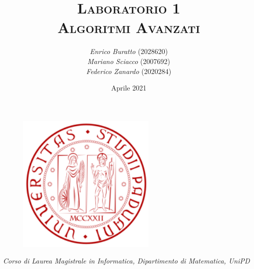 \documentclass[12pt]{article}
\title{ \huge\textsc{Laboratorio 1} \\
		\large\textsc{Algoritmi Avanzati}}
\author{\textit{Enrico Buratto} (2028620)\\ 
        \textit{Mariano Sciacco} (2007692)\\
        \textit{Federico Zanardo} (2020284)}
\date{\small Aprile 2021}
\renewcommand{\baselinestretch}{1.075}
\newcommand{\hr}{\par\vspace{-.1\ht\strutbox}\noindent\hrulefill\par}
\begin{document}
 

\begin{figure}[t!]
    \centering
    \includegraphics[height=18em]{res/images/logo.png}
\end{figure}

\maketitle 
\thispagestyle{empty}

\begin{center}
    \vspace{12em}
    \hr
    \textit{Corso di Laurea Magistrale in Informatica, Dipartimento di Matematica, UniPD}
\end{center}

\newpage
\renewcommand{\baselinestretch}{0.95}\normalsize
\tableofcontents
\renewcommand{\baselinestretch}{1.075}\normalsize

\newpage

\end{document}
